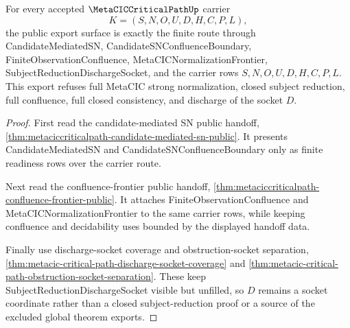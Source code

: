 \begin{theorem}
\label{thm:metacic-critical-path-public-export}
For every accepted $\MetaCICCriticalPathUp$ carrier
$$
K=(S,N,O,U,D,H,C,P,L),
$$
the public export surface is exactly the finite route through CandidateMediatedSN, CandidateSNConfluenceBoundary, FiniteObservationConfluence, MetaCICNormalizationFrontier, SubjectReductionDischargeSocket, and the carrier rows $S,N,O,U,D,H,C,P,L$. This export refuses full MetaCIC strong normalization, closed subject reduction, full confluence, full closed consistency, and discharge of the socket $D$.
\end{theorem}
\begin{proof}
First read the candidate-mediated SN public handoff, \autoref{thm:metaciccriticalpath-candidate-mediated-sn-public}. It presents CandidateMediatedSN and CandidateSNConfluenceBoundary only as finite readiness rows over the carrier route.

Next read the confluence-frontier public handoff, \autoref{thm:metaciccriticalpath-confluence-frontier-public}. It attaches FiniteObservationConfluence and MetaCICNormalizationFrontier to the same carrier rows, while keeping confluence and decidability uses bounded by the displayed handoff data.

Finally use discharge-socket coverage and obstruction-socket separation, \autoref{thm:metacic-critical-path-discharge-socket-coverage} and \autoref{thm:metacic-critical-path-obstruction-socket-separation}. These keep SubjectReductionDischargeSocket visible but unfilled, so $D$ remains a socket coordinate rather than a closed subject-reduction proof or a source of the excluded global theorem exports.
\end{proof}

